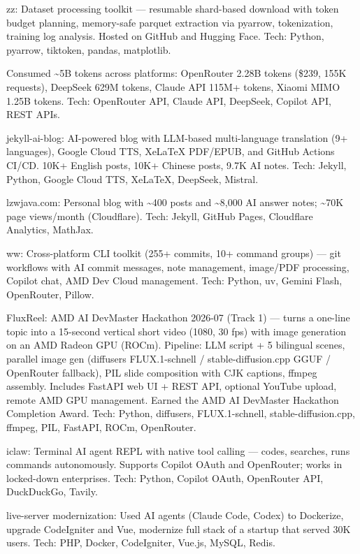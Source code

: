 \begin{cventries}
{\begin{cvitems}
        \item {zz: Dataset processing toolkit — resumable shard-based download with token budget planning, memory-safe parquet extraction via pyarrow, tokenization, training log analysis. Hosted on GitHub and Hugging Face. Tech: Python, pyarrow, tiktoken, pandas, matplotlib.}
        \item {Consumed \textasciitilde5B tokens across platforms: OpenRouter 2.28B tokens (\$239, 155K requests), DeepSeek 629M tokens, Claude API 115M+ tokens, Xiaomi MIMO 1.25B tokens. Tech: OpenRouter API, Claude API, DeepSeek, Copilot API, REST APIs.}
        \item {jekyll-ai-blog: AI-powered blog with LLM-based multi-language translation (9+ languages), Google Cloud TTS, XeLaTeX PDF/EPUB, and GitHub Actions CI/CD. 10K+ English posts, 10K+ Chinese posts, 9.7K AI notes. Tech: Jekyll, Python, Google Cloud TTS, XeLaTeX, DeepSeek, Mistral.}
        \item {lzwjava.com: Personal blog with \textasciitilde400 posts and \textasciitilde8,000 AI answer notes; \textasciitilde70K page views/month (Cloudflare). Tech: Jekyll, GitHub Pages, Cloudflare Analytics, MathJax.}
        \item {ww: Cross-platform CLI toolkit (255+ commits, 10+ command groups) — git workflows with AI commit messages, note management, image/PDF processing, Copilot chat, AMD Dev Cloud management. Tech: Python, uv, Gemini Flash, OpenRouter, Pillow.}
        \item {FluxReel: AMD AI DevMaster Hackathon 2026-07 (Track 1) — turns a one-line topic into a 15-second vertical short video (1080, 30 fps) with image generation on an AMD Radeon GPU (ROCm). Pipeline: LLM script + 5 bilingual scenes, parallel image gen (diffusers FLUX.1-schnell / stable-diffusion.cpp GGUF / OpenRouter fallback), PIL slide composition with CJK captions, ffmpeg assembly. Includes FastAPI web UI + REST API, optional YouTube upload, remote AMD GPU management. Earned the AMD AI DevMaster Hackathon Completion Award. Tech: Python, diffusers, FLUX.1-schnell, stable-diffusion.cpp, ffmpeg, PIL, FastAPI, ROCm, OpenRouter.}
        \item {iclaw: Terminal AI agent REPL with native tool calling — codes, searches, runs commands autonomously. Supports Copilot OAuth and OpenRouter; works in locked-down enterprises. Tech: Python, Copilot OAuth, OpenRouter API, DuckDuckGo, Tavily.}
        \item {live-server modernization: Used AI agents (Claude Code, Codex) to Dockerize, upgrade CodeIgniter and Vue, modernize full stack of a startup that served 30K users. Tech: PHP, Docker, CodeIgniter, Vue.js, MySQL, Redis.}
      \end{cvitems}
    }


\end{cventries}
